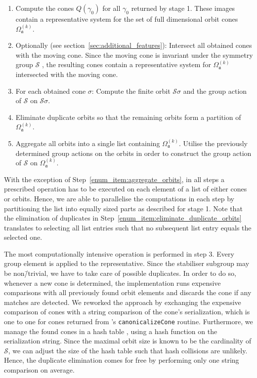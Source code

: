 \begin{enumerate}
	\item Compute the cones $Q(\gamma_0)$ for all \afaces{} $\gamma_0$ returned by stage 1. These images contain a representative system for the set of full dimensional orbit cones $\Omega_\mathfrak{a}^{(k)}$. 
	\item Optionally (see section~\ref{sec:additional_features}): Intersect all obtained cones with the moving cone. Since the moving cone is invariant under the symmetry group $\mathcal{S}$ , the resulting cones contain a representative system for $\Omega_\mathfrak{a}^{(k)}$ intersected with the moving cone.
	\item For each obtained cone $\sigma$: Compute the finite orbit $\mathcal{S}\sigma$ and the group action of $\mathcal{S}$ on $\mathcal{S}\sigma$. \label{enum_item:compute_orbit_cone_orbits}
	\item Eliminate duplicate orbits so that the remaining orbits form a partition of $\Omega_\mathfrak{a}^{(k)}$. \label{enum_item:eliminate_duplicate_orbits}
	\item Aggregate all orbits into a single list containing $\Omega_\mathfrak{a}^{(k)}$. Utilise the previously determined group actions on the orbits in order to construct the group action of $\mathcal{S}$ on $\Omega_\mathfrak{a}^{(k)}$. \label{enum_item:aggregate_orbits}
\end{enumerate}

With the exception of Step~\ref{enum_item:aggregate_orbits}, in all steps a prescribed operation has to be executed on each element of a list of either cones or orbits. Hence, we are able to parallelise the computations in each step by partitioning the list into equally sized parts as described for stage 1. Note that the elimination of duplicates in Step~\ref{enum_item:eliminate_duplicate_orbits} translates to selecting all list entries such that no subsequent list entry equals the selected one.

The most computationally intensive operation is performed in step 3. Every group element is applied to the representative. Since the stabiliser subgroup may be non\=/trivial, we have to take care of possible duplicates. In order to do so, whenever a new cone is determined, the \gitfanlib{} implementation runs expensive comparisons with all previously found orbit elements and discards the cone if any matches are detected. We reworked the approach by
exchanging the expensive comparison of cones with a string comparison of the cone's serialization, which is one to one for cones returned from \singular's \texttt{canonicalizeCone} routine. Furthermore, we manage the found cones in a hash table , using a hash function on the serialization string. Since the maximal orbit size is known to be the cardinality of $\mathcal{S}$, we can adjust the size of the hash table such that hash collisions are unlikely. Hence, the duplicate elimination comes for free by performing only one string comparison on average.


